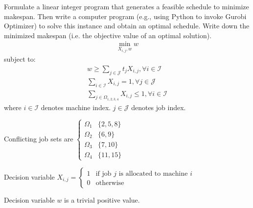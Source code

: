 \documentclass[letterpaper,10pt,english]{sphinxmanual}
\begin{document}
\sphinxAtStartPar
Formulate a linear integer program that generates a feasible schedule to minimize makespan.
Then write a computer program (e.g., using Python to invoke Gurobi Optimizer) to solve this instance
and obtain an optimal schedule. Write down the minimized makespan (i.e. the objective value of
an optimal solution).
\begin{equation*}
\begin{split}\min_{X_{i,j}, w} w\end{split}
\end{equation*}
\sphinxAtStartPar
subject to:
\begin{equation*}
\begin{split}w \geq \sum_{j \in \mathcal{J}} t_{j} X_{i,j} , \forall i \in \mathcal{I} \\
\sum_{i \in \mathcal{I}} X_{i,j} = 1 , \forall j \in \mathcal{J} \\
\sum_{j \in \Omega_{1,2,3,4}} X_{i,j} \leq 1 , \forall i \in \mathcal{I}\end{split}
\end{equation*}
\sphinxAtStartPar
where \(i \in \mathcal{I}\) denotes machine index. \(j \in \mathcal{J}\) denotes job index.

\sphinxAtStartPar
Conflicting job sets are \(\left\{\begin{matrix}
\Omega_{1} & \{ 2,5,8 \}\\
\Omega_{2} & \{ 6,9 \}\\
\Omega_{3} & \{ 7,10 \}\\
\Omega_{4} & \{ 11,15 \}
\end{matrix}\right.\)

\sphinxAtStartPar
Decision variable \(X_{i,j} = \left\{\begin{matrix}
1 & \text{if job } j \text{ is allocated to machine } i\\
0 & \text{otherwise}
\end{matrix}\right.\)

\sphinxAtStartPar
Decision variable \(w\) is a trivial positive value.
\end{document}
